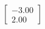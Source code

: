 \documentclass[preview]{standalone}
\begin{document}
\begin{align*}
\begin{bmatrix} -3.00 \\ 2.00 \end{bmatrix}
\end{align*}
\end{document}
